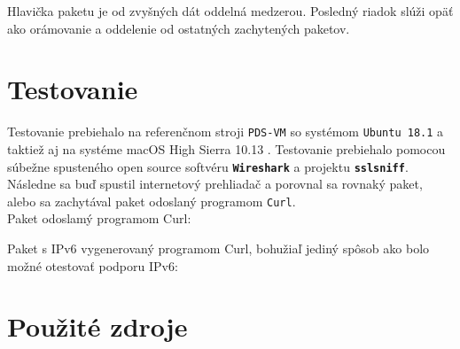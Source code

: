 \documentclass[11pt, a4paper]{article}
\begin{document}
Hlavička paketu je od zvyšných dát oddelná medzerou. Posledný riadok slúži opäť ako orámovanie a oddelenie od ostatných zachytených paketov.

	\newpage
	\section{Testovanie}
	Testovanie prebiehalo na referenčnom stroji \texttt{PDS-VM} so systémom \texttt{Ubuntu 18.1} a taktiež aj na systéme macOS High Sierra 10.13 . Testovanie prebiehalo pomocou súbežne spusteného open source softvéru \texttt{\textbf{Wireshark}} a projektu \texttt{\textbf{sslsniff}}. Následne sa buď spustil internetový prehliadač a porovnal sa rovnaký paket, alebo sa zachytával paket odoslaný programom \texttt{Curl}.\\
	
	Paket odoslamý programom Curl:
	
%	
%	
\newpage
	Paket s IPv6 vygenerovaný programom Curl, bohužiaľ jediný spôsob ako bolo možné otestovať podporu IPv6:
	
%	
%	
	
	
	\newpage
	\section{Použité zdroje}
	
	
	\renewcommand{\refname}{Použitá literatúra}
	
	
	
\end{document}
